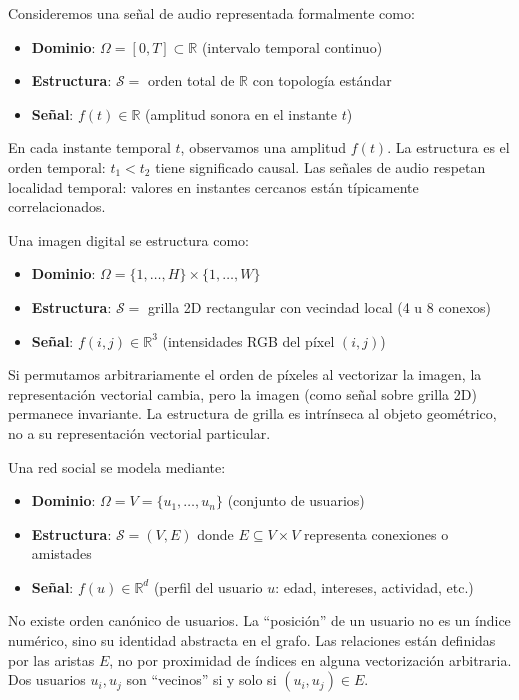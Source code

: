 \begin{example}\label{ex:senal_audio}
Consideremos una señal de audio representada formalmente como:
\begin{itemize}
	\item \textbf{Dominio}: $\Omega = [0, T] \subset \mathbb{R}$ (intervalo temporal continuo)
	\item \textbf{Estructura}: $\mathcal{S} = $ orden total de $\mathbb{R}$ con topología estándar
	\item \textbf{Señal}: $f(t) \in \mathbb{R}$ (amplitud sonora en el instante $t$)
\end{itemize}

En cada instante temporal $t$, observamos una amplitud $f(t)$. La estructura es el orden temporal: $t_1 < t_2$ tiene significado causal. Las señales de audio respetan localidad temporal: valores en instantes cercanos están típicamente correlacionados.
\end{example}

\begin{example}\label{ex:imagen_grilla}
Una imagen digital se estructura como:
\begin{itemize}
	\item \textbf{Dominio}: $\Omega = \{1,\ldots,H\} \times \{1,\ldots,W\}$
	\item \textbf{Estructura}: $\mathcal{S} = $ grilla 2D rectangular con vecindad local (4 u 8 conexos)
	\item \textbf{Señal}: $f(i,j) \in \mathbb{R}^3$ (intensidades RGB del píxel $(i,j)$)
\end{itemize}

Si permutamos arbitrariamente el orden de píxeles al vectorizar la imagen, la representación vectorial cambia, pero la imagen (como señal sobre grilla 2D) permanece invariante. La estructura de grilla es intrínseca al objeto geométrico, no a su representación vectorial particular.
\end{example}

\begin{example}\label{ex:red_social}
Una red social se modela mediante:
\begin{itemize}
	\item \textbf{Dominio}: $\Omega = V = \{u_1, \ldots, u_n\}$ (conjunto de usuarios)
	\item \textbf{Estructura}: $\mathcal{S} = (V, E)$ donde $E \subseteq V \times V$ representa conexiones o amistades
	\item \textbf{Señal}: $f(u) \in \mathbb{R}^d$ (perfil del usuario $u$: edad, intereses, actividad, etc.)
\end{itemize}

No existe orden canónico de usuarios. La ``posición'' de un usuario no es un índice numérico, sino su identidad abstracta en el grafo. Las relaciones están definidas por las aristas $E$, no por proximidad de índices en alguna vectorización arbitraria. Dos usuarios $u_i, u_j$ son ``vecinos'' si y solo si $(u_i, u_j) \in E$.
\end{example}

